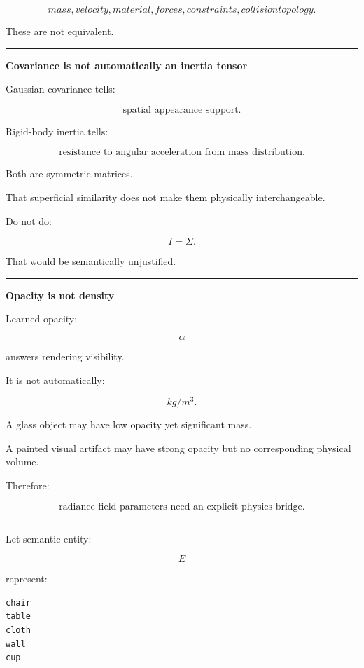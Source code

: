 \[
mass,
velocity,
material,
forces,
constraints,
collision topology.
\]

These are not equivalent.

\begin{center}\rule{0.5\linewidth}{0.5pt}\end{center}

\textbf{Covariance is not automatically an inertia tensor}

Gaussian covariance tells:

\[
\boxed{
\text{spatial appearance support}.
}
\]

Rigid-body inertia tells:

\[
\boxed{
\text{resistance to angular acceleration from mass distribution}.
}
\]

Both are symmetric matrices.

That superficial similarity does not make them physically interchangeable.

Do not do:

\[
I=\Sigma.
\]

That would be semantically unjustified.

\begin{center}\rule{0.5\linewidth}{0.5pt}\end{center}

\textbf{Opacity is not density}

Learned opacity:

\[
\alpha
\]

answers rendering visibility.

It is not automatically:

\[
kg/m^3.
\]

A glass object may have low opacity yet significant mass.

A painted visual artifact may have strong opacity but no corresponding physical volume.

Therefore:

\[
\boxed{
\text{radiance-field parameters need an explicit physics bridge}.
}
\]

\begin{center}\rule{0.5\linewidth}{0.5pt}\end{center}

Let semantic entity:

\[
E
\]

represent:

\protect{}\label{f0n5qg}%
\begin{verbatim}
chair
table
cloth
wall
cup
\end{verbatim}

